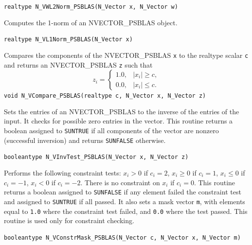 \documentclass[twoside,a4paper]{refart}
\theoremstyle{definition}
\begin{document}
\begin{description}
 	 \lstinline[style=CStyle]|realtype N_VWL2Norm_PSBLAS(N_Vector x, N_Vector w)|
 	
 	\item[\fbox{\texttt{N\_VL1Norm\_PSBLAS}}] Computes the 1-norm of an NVECTOR\_PSBLAS object.
 	
 	 \lstinline[style=CStyle]|realtype N_VL1Norm_PSBLAS(N_Vector x)|
 	
 	\item[\fbox{\texttt{N\_VCompare\_PSBLAS}}] Compares the components of the NVECTOR\_PSBLAS \lstinline[style=CStyle]|x| to the realtype scalar \lstinline[style=CStyle]|c|
 	and returns an NVECTOR\_PSBLAS \lstinline[style=CStyle]|z| such that
 	\begin{equation*}
 	z_i = \begin{cases}
 	1.0, & |x_i| \geq c,\\
 	0.0, & |x_i| \le c.
 	\end{cases}
 	\end{equation*}
 	 \lstinline[style=CStyle]|void N_VCompare_PSBLAS(realtype c, N_Vector x, N_Vector z)|
 	
 	\item[\fbox{\texttt{N\_VInvTest\_PSBLAS}}] Sets the entries of an NVECTOR\_PSBLAS to the inverse of the entries of the input. It checks for possible zero entries in the vector. This routine returns a boolean assigned to \lstinline[style=CStyle]|SUNTRUE| if all
 	components of the vector are nonzero (successful inversion) and returns \lstinline[style=CStyle]|SUNFALSE| otherwise.
 	
 	 \lstinline[style=CStyle]|booleantype N_VInvTest_PSBLAS(N_Vector x, N_Vector z)|
 	
 	\item[\fbox{\texttt{N\_VConstrMask\_PSBLAS}}] Performs the following constraint tests: $x_i > 0$ if $c_i = 2$, $x_i \geq 0$ if $c_i = 1$,
 	$x_i \leq 0$ if $c_i = -1$, $x_i < 0$ if $c_i = -2$. There is no constraint on $x_i$ if $c_i = 0$.
 	This routine returns a boolean assigned to \lstinline[style=CStyle]|SUNFALSE| if any element failed
 	the constraint test and assigned to \lstinline[style=CStyle]|SUNTRUE| if all passed. It also sets a
 	mask vector \lstinline[style=CStyle]|m|, with elements equal to \lstinline[style=CStyle]|1.0| where the constraint test failed,
 	and \lstinline[style=CStyle]|0.0| where the test passed. This routine is used only for constraint
 	checking.
 	
 	 \lstinline[style=CStyle]|booleantype N_VConstrMask_PSBLAS(N_Vector c, N_Vector x, N_Vector m)|
 	

\end{description}
\end{document}
